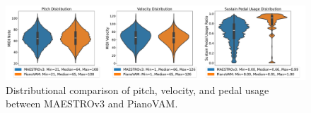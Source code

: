 \documentclass{article}
\begin{document}





\begin{figure}
    \centering
    \includegraphics[width=1\linewidth]{Images/combined_violinplot.pdf}
    \vspace{-7mm}    
    \caption{Distributional comparison of pitch, velocity, and pedal usage between MAESTROv3 and PianoVAM.}
    \label{fig:combined-violinplot}
\end{figure}
\end{document}
